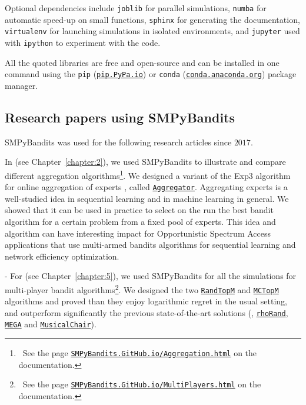 Optional dependencies include \texttt{joblib} \cite{joblib} for parallel simulations, \texttt{numba} \cite{numba} for automatic speed-up on small functions, \texttt{sphinx} \cite{sphinx} for generating the documentation, \texttt{virtualenv} \cite{virtualenv} for launching simulations in isolated environments, and \texttt{jupyter} \cite{jupyter} used with \texttt{ipython} \cite{ipython} to experiment with the code.

All the quoted libraries are free and open-source and can be installed in one command using the \texttt{pip} (\texttt{\href{https://pip.pypa.io/}{pip.PyPa.io}}) or \texttt{conda} (\texttt{\href{http://conda.anaconda.org/}{conda.anaconda.org}}) package manager.


\subsection{Research papers using SMPyBandits}

SMPyBandits was used for the following research articles since $2017$.

In \cite{Besson2018WCNC} (see Chapter~\ref{chapter:2}), we used SMPyBandits to illustrate and compare different aggregation algorithms\footnote{~See the page \texttt{\href{https://SMPyBandits.GitHub.io/Aggregation.html}{SMPyBandits.GitHub.io/Aggregation.html}} on the documentation.}. We designed a variant of the Exp3 algorithm for online aggregation of experts \cite{Bubeck12}, called \texttt{\href{https://SMPyBandits.GitHub.io/docs/Policies.Aggregator.html}{Aggregator}}. Aggregating experts is a well-studied idea in sequential learning and in machine learning in general. We showed that it can be used in practice to select on the run the best bandit algorithm for a certain problem from a fixed pool of experts. This idea and algorithm can have interesting impact for Opportunistic Spectrum Access applications \cite{Jouini09} that use multi-armed bandits algorithms for sequential learning and network efficiency optimization.

- For \cite{Besson2018ALT} (see Chapter~\ref{chapter:5}), we used SMPyBandits for all the simulations for multi-player bandit algorithms\footnote{~See the page \texttt{\href{https://SMPyBandits.GitHub.io/MultiPlayers.html}{SMPyBandits.GitHub.io/MultiPlayers.html}} on the documentation.}. We designed the two \texttt{\href{https://SMPyBandits.GitHub.io/docs/PoliciesMultiPlayers.RandTopM.html}{RandTopM}} and \texttt{\href{https://SMPyBandits.GitHub.io/docs/PoliciesMultiPlayers.MCTopM.html}{MCTopM}} algorithms and proved than they enjoy logarithmic regret in the usual setting, and outperform significantly the previous state-of-the-art solutions (\ie, \texttt{\href{https://SMPyBandits.GitHub.io/docs/PoliciesMultiPlayers.rhoRand.html}{rhoRand}}, \texttt{\href{https://SMPyBandits.GitHub.io/docs/Policies.MEGA.html}{MEGA}} and \texttt{\href{https://SMPyBandits.GitHub.io/docs/Policies.MusicalChair.html}{MusicalChair}}).

